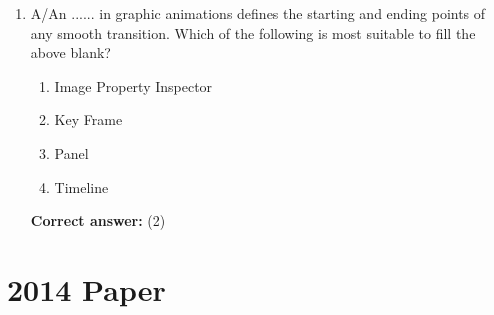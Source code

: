 \documentclass[12pt]{article}
\begin{document}
\begin{enumerate}[label=Q\arabic*:,leftmargin=*,resume]
\item A/An ...... in graphic animations defines the starting and ending points of any smooth transition. Which of the following is most suitable to fill the above blank?\\
\begin{enumerate}[label=(\arabic*)]
\item Image Property Inspector
\item Key Frame
\item Panel
\item Timeline
\end{enumerate}
\textbf{Correct answer:} (2)
\end{enumerate}

\section*{2014 Paper}
\end{document}
